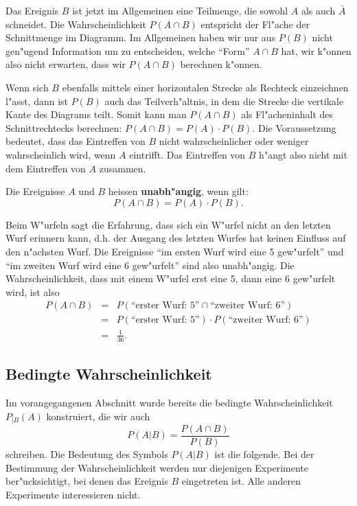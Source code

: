 Das Ereignis $B$ ist jetzt im Allgemeinen eine Teilmenge, die sowohl $A$ 
als auch $\bar A$ schneidet. Die Wahrscheinlichkeit $P(A \cap B)$ entspricht
der Fl"ache der Schnittmenge im Diagramm. Im Allgemeinen haben wir
nur aus $P(B)$ nicht gen"ugend Information um zu entscheiden, welche
``Form'' $A\cap B$ hat, wir k"onnen also nicht erwarten, dass wir $P(A\cap B)$
berechnen k"onnen.

Wenn sich $B$ ebenfalls mittels einer horizontalen Strecke als Rechteck
einzeichnen l"asst, dann ist $P(B)$ auch das Teilverh"altnis, in dem
die Strecke die vertikale Kante des Diagrams teilt. Somit kann man $P(A\cap B)$
als Fl"acheninhalt des Schnittrechtecks berechnen: $P(A\cap B)=P(A)\cdot P(B)$.
Die Voraussetzung bedeutet, dass das Eintreffen von $B$ nicht wahrscheinlicher
oder weniger
wahrscheinlich wird, wenn $A$ eintrifft. Das Eintreffen von $B$ h"angt also
nicht mit dem Eintreffen von $A$ zusammen.

\begin{definition}
\label{def-unabhaengige-ereignisse}
Die Ereignisse $A$ und $B$ heissen {\bf unabh"angig}, wenn gilt:
\[
P(A\cap B) = P(A)\cdot P(B).
\]
\end{definition}

Beim W"urfeln sagt die Erfahrung, dass sich ein W"urfel nicht an den
letzten Wurf erinnern kann, d.h. der Ausgang des letzten Wurfes hat
keinen Einfluss auf den n"achsten Wurf. Die Ereignisse ``im ersten
Wurf wird eine 5 gew"urfelt'' und ``im zweiten Wurf wird eine 6 gew"urfelt''
sind also unabh"angig. Die Wahrscheinlichkeit, dass mit einem W"urfel
erst eine 5, dann eine 6 gew"urfelt wird, ist also
\begin{eqnarray*}
P(A\cap B)&=&P(\text{``erster Wurf: 5''}\cap\text{``zweiter Wurf: 6''})\\
&=&P(\text{``erster Wurf: 5''})\cdot P(\text{``zweiter Wurf: 6''})\\
&=&\frac1{36}.
\end{eqnarray*}

\subsection{Bedingte Wahrscheinlichkeit}
Im vorangegangenen Abschnitt wurde bereits die bedingte Wahrscheinlichkeit
$P_{|B}(A)$ konstruiert, die wir auch
\[
P(A|B)=\frac{P(A\cap B)}{P(B)}
\]
schreiben. Die Bedeutung des Symbols $P(A|B)$ ist die folgende. Bei der
Bestimmung der Wahrscheinlichkeit werden nur diejenigen Experimente
ber"ucksichtigt, bei denen das Ereignis $B$ eingetreten ist.
Alle anderen Experimente interessieren nicht.

